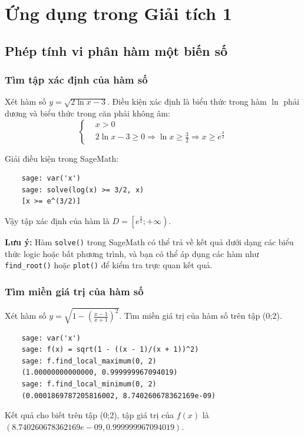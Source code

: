 \section{Ứng dụng trong Giải tích 1}

\subsection{Phép tính vi phân hàm một biến số}

\subsubsection{Tìm tập xác định của hàm số}

Xét hàm số \( y = \sqrt{2\ln{x} - 3} \). Điều kiện xác định là biểu thức trong hàm $\ln$ phải dương và biểu thức trong căn phải không âm:
\[
\left\{
\begin{aligned}
	&x > 0 \\
	&2\ln{x} - 3 \geq 0 \Rightarrow \ln{x} \geq \frac{3}{2} \Rightarrow x \geq e^{\frac{3}{2}}
\end{aligned}
\right.
\]

Giải điều kiện trong SageMath:
\begin{lstlisting}
	sage: var('x')
	sage: solve(log(x) >= 3/2, x)
	[x >= e^(3/2)]
\end{lstlisting}

Vậy tập xác định của hàm là $D=\left[e^{\frac{3}{2}};+\infty \right)$.

\textbf{Lưu ý:} Hàm \texttt{solve()} trong SageMath có thể trả về kết quả dưới dạng các biểu thức logic hoặc bất phương trình, và bạn có thể áp dụng các hàm như \texttt{find\_root()} hoặc \texttt{plot()} để kiểm tra trực quan kết quả. 

\subsubsection{Tìm miền giá trị của hàm số}

Xét hàm số \( y = \sqrt{1 - \left( \frac{x - 1}{x + 1} \right)^2} \). Tìm miền giá trị của hàm số trên tập (0;2).

\begin{lstlisting}
	sage: var('x')
	sage: f(x) = sqrt(1 - ((x - 1)/(x + 1))^2)
	sage: f.find_local_maximum(0, 2)
	(1.00000000000000, 0.999999967094019)
	sage: f.find_local_minimum(0, 2)
	(0.0001869787205816002, 8.740260678362169e-09)
\end{lstlisting}

Kết quả cho biết trên tập (0;2), tập giá trị của $f(x)$ là \\$(8.740260678362169e-09, 0.999999967094019)
$.

